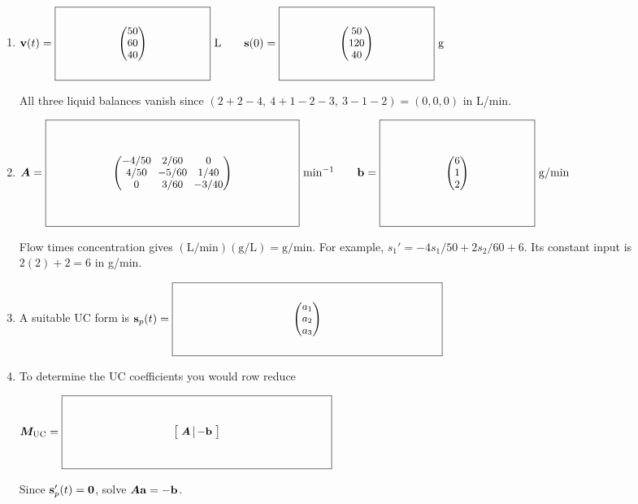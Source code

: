 \documentclass[11pt,letterpaper]{article}
\newcommand{\mat}[1]{\bm{#1}}
\newcommand{\KeyBox}[3]{%
  \vcenter{\hbox{$\boxed{\parbox[c][#2][c]{#1}{\centering\small
    \setlength{\arraycolsep}{3pt}\renewcommand{\arraystretch}{0.95}%
    \ensuremath{\displaystyle #3}}}$}}}
\begin{document}
\begin{enumerate}
\item $\vect{v}(t)=\KeyBox{1.8in}{0.8in}{\begin{pmatrix}50\\60\\40\end{pmatrix}}\ \mathrm{L}\qquad
\vect{s}(0)=\KeyBox{1.8in}{0.8in}{\begin{pmatrix}50\\120\\40\end{pmatrix}}\ \mathrm{g}$
\par{\footnotesize All three liquid balances vanish since $(2+2-4,\ 4+1-2-3,\ 3-1-2)=(0,0,0)$ in L/min.}
\item $\mat{A}=\KeyBox{3.0in}{1.2in}{\begin{pmatrix}
-4/50&2/60&0\\4/50&-5/60&1/40\\0&3/60&-3/40
\end{pmatrix}}\ \mathrm{min}^{-1}\qquad
\vect{b}=\KeyBox{1.8in}{1.2in}{\begin{pmatrix}6\\1\\2\end{pmatrix}}\ \mathrm{g/min}$
\par{\footnotesize Flow times concentration gives $(\mathrm{L/min})(\mathrm{g/L})=\mathrm{g/min}$.
For example, $s_1'=-4s_1/50+2s_2/60+6$. Its constant input is $2(2)+2=6$ in g/min.}
\item A suitable UC form is $\vect{s}_p(t)=\KeyBox{3.2in}{0.8in}{\begin{pmatrix}a_1\\a_2\\a_3\end{pmatrix}}$
\item To determine the UC coefficients you would row reduce
\par $\mat{M}_{\mathrm{UC}}=\KeyBox{3.2in}{0.8in}{\left[\begin{array}{c|c}\mat{A}&-\vect{b}\end{array}\right]}$
\par{\footnotesize Since $\mathbf{s}_p'(t)=\mathbf{0}$, solve $\mat{A}\vect{a}=-\vect{b}$.}
\end{enumerate}
\end{document}
